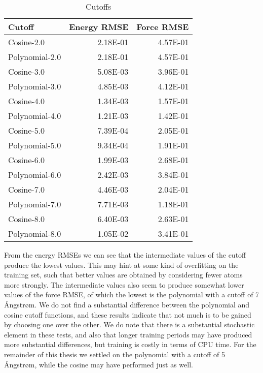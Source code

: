 \begin{table}[H]
\centering
\begin{tabular}{lrr}
\toprule
     Cutoff &  Energy RMSE &  Force RMSE \\
\midrule
     Cosine-2.0 &     2.18E-01 &    4.57E-01 \\
 Polynomial-2.0 &     2.18E-01 &    4.57E-01 \\
     Cosine-3.0 &     5.08E-03 &    3.96E-01 \\
 Polynomial-3.0 &     4.85E-03 &    4.12E-01 \\
     Cosine-4.0 &     1.34E-03 &    1.57E-01 \\
 Polynomial-4.0 &     1.21E-03 &    1.42E-01 \\
     Cosine-5.0 &     7.39E-04 &    2.05E-01 \\
 Polynomial-5.0 &     9.34E-04 &    1.91E-01 \\
     Cosine-6.0 &     1.99E-03 &    2.68E-01 \\
 Polynomial-6.0 &     2.42E-03 &    3.84E-01 \\
     Cosine-7.0 &     4.46E-03 &    2.04E-01 \\
 Polynomial-7.0 &     7.71E-03 &    1.18E-01 \\
     Cosine-8.0 &     6.40E-03 &    2.63E-01 \\
 Polynomial-8.0 &     1.05E-02 &    3.41E-01 \\
\bottomrule
\end{tabular}
\caption{Cutoffs}
\label{table:cutoffs}
\end{table}

From the energy RMSEs we can see that the intermediate values of the
cutoff produce the lowest values. This may hint at some kind
of overfitting on the training set,
such that better values are obtained by considering fewer atoms more strongly.
The intermediate values also
seem to produce somewhat lower values of the force RMSE,
of which the lowest is the polynomial with a cutoff of 7 Ångstrøm.
We do not find a substantial difference between the polynomial
and cosine cutoff functions, and these results indicate that not
much is to be gained by choosing one over the other.
We do note that there is a substantial
stochastic element in these tests, and also that longer training
periods may have produced more substantial differences, but
training is costly in terms of CPU time.
For the remainder
of this thesis we settled on the polynomial with a cutoff of 5 Ångstrøm,
while the cosine may have performed just as well.

